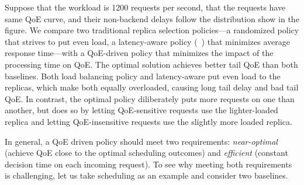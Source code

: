 Suppose that the workload is 1200 requests per second, that the requests have same QoE curve, and their non-backend delays follow the distribution show in the figure.
We compare two traditional replica selection policies---a randomized policy that strives to put even load, a latency-aware policy (\eg~\cite{suresh2015c3,wu2015costlo}) that minimizes average response time---with a QoE-driven policy that minimizes the impact of the processing time on QoE.
The optimal solution achieves better tail QoE than both baselines. 
Both load balancing policy and latency-aware put even load to the replicas, which make both equally overloaded, causing long tail delay and bad tail QoE.
In contrast, the optimal policy diliberately puts more requests on one than another, but does so by letting QoE-sensitive requests use the lighter-loaded replica and letting QoE-insensitive requests use the slightly more loaded replica. 





In general, a QoE driven policy should meet two requirements: {\em near-optimal} (\ie achieve QoE close to the optimal scheduling outcomes) and {\em efficient} (\ie constant decision time on each incoming request).
To see why meeting both requirements is challenging, let us take scheduling as an example and consider two baselines.


